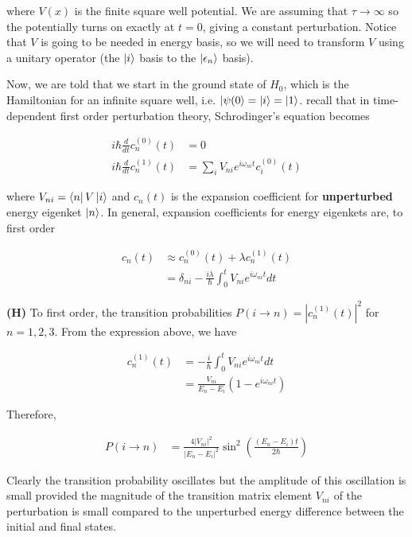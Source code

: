 \documentclass[12pt]{article}
\theoremstyle{definition}
\begin{document}
{where $V(x)$ is the finite square well potential. We are assuming that $\tau\rightarrow\infty$ so the potentially turns on exactly at $t=0$, giving a constant perturbation. Notice that $V$ is going to be needed in energy basis, so we will need to transform $V$ using a unitary operator (the $\ket{i}$ basis to the $\ket{\epsilon_{n}}$ basis). 
\clearpage

Now, we are told that we start in the ground state of $H_{0}$, which is the Hamiltonian for an infinite square well, i.e. $\ket{\psi(0} = \ket{i} = \ket{1}$. recall that in time-dependent first order perturbation theory, Schrodinger's equation becomes

\begin{align*}
i\hbar\frac{d}{dt}c_{n}^{(0)}(t) &= 0\\
i\hbar\frac{d}{dt}c_{n}^{(1)}(t) &= \sum_{i}V_{ni}e^{i\omega_{ni}t}c_{i}^{(0)}(t)
\end{align*}

where $V_{ni} = \bra{n}V\ket{i}$ and $c_{n}(t)$ is the expansion coefficient for \textbf{unperturbed} energy eigenket $\ket{n}$. In general, expansion coefficients for energy eigenkets are, to first order

\begin{align*}
c_{n}(t) &\approx c_{n}^{(0)}(t) + \lambda c_{n}^{(1)}(t)\\
&= \delta_{ni} - \frac{i\lambda}{\hbar}\int_{0}^{t}V_{ni}e^{i\omega_{ni}t}dt
\end{align*}


\noindent \textbf{(H)} To first order, the transition probabilities $P(i\rightarrow n) = |c_{n}^{(1)}(t)|^{2}$ for $n=1,2,3$. From the expression above, we have

\begin{align*}
c_{n}^{(1)}(t) &= -\frac{i}{\hbar}\int_{0}^{t}V_{ni} e^{i\omega_{ni}t}dt\\
&= \frac{V_{ni}}{E_{n}-E_{i}}(1-e^{i\omega_{ni}t})
\end{align*}

Therefore,

\begin{align*}
P(i\rightarrow n) &= \frac{4|V_{ni}|^{2}}{|E_{n}-E_{i}|^{2}}\sin^{2}\left(\frac{(E_{n}-E_{i})t}{2\hbar}\right)
\end{align*}

Clearly the transition probability oscillates but the amplitude of this oscillation is small provided the magnitude of the transition matrix element $V_{ni}$ of the perturbation is small compared to the unperturbed energy difference between the initial and final states.
\clearpage

}
\end{document}

